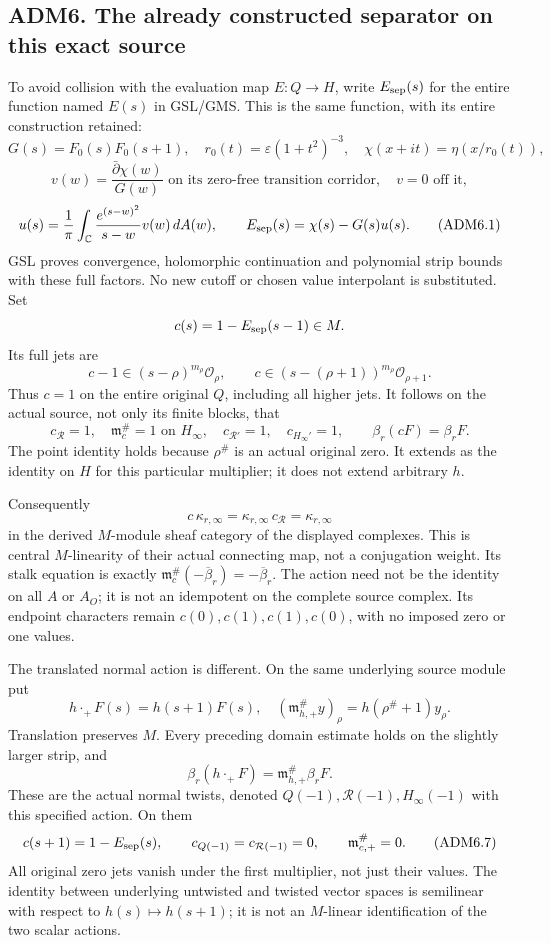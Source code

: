 \subsection{ADM6. The already constructed separator on this exact
source}\label{adm6.-the-already-constructed-separator-on-this-exact-source}

To avoid collision with the evaluation map \(E:Q\to H\), write
\(E_{\rm sep}(s)\) for the entire function named \(E(s)\) in GSL/GMS.
This is the same function, with its entire construction retained: \[
G(s)=F_0(s)F_0(s+1),\quad r_0(t)=\varepsilon(1+t^2)^{-3},
\quad\chi(x+it)=\eta(x/r_0(t)),
\] \[
v(w)=\frac{\bar\partial\chi(w)}{G(w)}
\text{ on its zero-free transition corridor},\quad v=0\text{ off it},
\] \[
u(s)=\frac1\pi\int_{\mathbb C}\frac{e^{(s-w)^2}}{s-w}v(w)\,dA(w),
\qquad E_{\rm sep}(s)=\chi(s)-G(s)u(s).
\tag{ADM6.1}
\] GSL proves convergence, holomorphic continuation and polynomial strip
bounds with these full factors. No new cutoff or chosen value
interpolant is substituted. Set \[
c(s)=1-E_{\rm sep}(s-1)\in M.
\] Its full jets are \[
c-1\in(s-\rho)^{m_\rho}\mathcal O_\rho,\qquad
c\in(s-(\rho+1))^{m_\rho}\mathcal O_{\rho+1}.
\tag{ADM6.2}
\] Thus \(c=1\) on the entire original \(Q\), including all higher jets.
It follows on the actual source, not only its finite blocks, that \[
c_{\mathcal R}=1,\quad
\mathfrak m_c^\#=1\text{ on }H_\infty,\quad
c_{\mathcal R'}=1,\quad c_{H_\infty'}=1,\qquad
\beta_r(cF)=\beta_rF.
\tag{ADM6.3}
\] The point identity holds because \(\rho^\#\) is an actual original
zero. It extends as the identity on \(H\) for this particular
multiplier; it does not extend arbitrary \(h\).

Consequently \[
c\,\kappa_{r,\infty}
=\kappa_{r,\infty}\,c_{\mathcal R}
=\kappa_{r,\infty}
\tag{ADM6.4}
\] in the derived \(M\)-module sheaf category of the displayed
complexes. This is central \(M\)-linearity of their actual connecting
map, not a conjugation weight. Its stalk equation is exactly
\(\mathfrak m_c^\#(-\overline\beta_r)=-\overline\beta_r\). The action
need not be the identity on all \(A\) or \(A_O\); it is not an
idempotent on the complete source complex. Its endpoint characters
remain \(c(0),c(1),c(1),c(0)\), with no imposed zero or one values.

The translated normal action is different. On the same underlying source
module put \[
h\cdot_{+}F(s)=h(s+1)F(s),\quad
(\mathfrak m_{h,+}^\#y)_\rho=h(\rho^\#+1)y_\rho.
\tag{ADM6.5}
\] Translation preserves \(M\). Every preceding domain estimate holds on
the slightly larger strip, and \[
\beta_r(h\cdot_+F)=\mathfrak m_{h,+}^\#\beta_rF.
\tag{ADM6.6}
\] These are the actual normal twists, denoted
\(Q(-1),\mathcal R(-1),H_\infty(-1)\) with this specified action. On
them \[
c(s+1)=1-E_{\rm sep}(s),\qquad
c_{Q(-1)}=c_{\mathcal R(-1)}=0,\qquad
\mathfrak m_{c,+}^\#=0 .
\tag{ADM6.7}
\] All original zero jets vanish under the first multiplier, not just
their values. The identity between underlying untwisted and twisted
vector spaces is semilinear with respect to \(h(s)\mapsto h(s+1)\); it
is not an \(M\)-linear identification of the two scalar actions.

